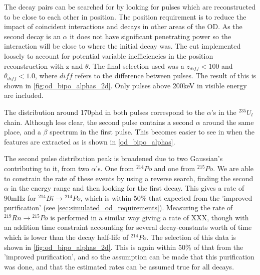 \par
The decay pairs can be searched for by looking for pulses which are reconstructed to be close to each other in position.
The position requirement is to reduce the impact of coincident interactions and decays in other areas of the OD.
As the second decay is an $\alpha$ it does not have significant penetrating power so the interaction will be close to where the initial decay was.
The cut implemented loosely to account for potential variable inefficiencies in the position reconstruction with z and $\theta$.
The final selection used was a $z_{diff} < 100$ and $\theta_{diff} < 1.0$, where $diff$ refers to the difference between pulses.
The result of this is shown in \autoref{fig:od_bipo_alphas_2d}.
Only pulses above 200keV in visible energy are included.



\par
The distribution around 170phd in both pulses correspond to the $\alpha$'s in the ${}^{235}U_{l}$ chain.
Although less clear, the second pulse contains a second $\alpha$ around the same place, and a $\beta$ spectrum in the first pulse.
This becomes easier to see in when the features are extracted as is shown in \autoref{od_bipo_alphas}.



\par
The second pulse distribution peak is broadened due to two Gaussian's contributing to it, from two $\alpha$'s.
One from ${}^{214}Po$ and one from ${}^{215}Po$.
We are able to constrain the rate of these events by using a reverse search, finding the second $\alpha$ in the energy range and then looking for the first decay.
This gives a rate of 90mHz for ${}^{214}Bi \to {}^{214}Po$, which is within 50\% that expected from the 'improved purification' (see \autoref{sec:simulated_od_requirements}).
Measuring the rate of ${}^{219}Rn \to {}^{215}Po$ is performed in a similar way giving a rate of XXX, though with an addition time constraint accounting for several decay-constants worth of time which is lower than the decay half-life of ${}^{214}Po$.
The selection of this data is shown in \autoref{fig:od_bipo_alphas_2d}.
This is again within 50\% of that from the 'improved purification', and so the assumption can be made that this purification was done, and that the estimated rates can be assumed true for all decays.


